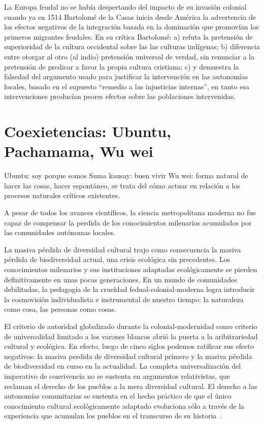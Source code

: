 \documentclass[a4paper,10pt]{book}
\theoremstyle{definition}
\begin{document}

La Europa feudal no se había despertando del impacto de su invasión colonial cuando ya en 1514 Bartolomé de la Casas inicia desde América la advertencia de los efectos negativos de la integración basada en la dominación que promovían los primeros migrantes feudales.
En su crítica Bartolomé:
a) refuta la pretensión de superioridad de la cultura occidental sobre las las culturas indígenas;
b) diferencia entre otorgar al otro (al indio) pretensión universal de verdad, sin renunciar a la pretensión de predicar a favor la propia cultura cristiana;
c) y demuestra la falsedad del argumento usado para justificar la intervención en las autonomías locales, basado en el supuesto ``remedio a las injusticias internas'', en tanto esa intervenciones producían peores efectos sobre las poblaciones intervenidas.

\section{Coexietencias: Ubuntu, Pachamama, Wu wei}

Ubuntu: soy porque somos
Suma kausay: buen vivir
Wu wei\cite{gerlach2005-wuwei}: forma natural de hacer las cosas, hacer espontáneo, se trata del cómo actuar en relación a los procesos naturales críticos existentes. 

A pesar de todos los avances científicos, la ciencia metropolitana moderna no fue capaz de compensar la perdida de los conocimientos milenarios acumulados por las comunidades autónomas locales.

La masiva pérdida de diversidad cultural trajo como consecuencia la masiva pérdida de biodiversidad actual, una crisis ecológica sin precedentes.
Los conocimientos milenarios y sus instituciones adaptadas ecológicamente se pierden definitivamente en unas pocas generaciones.
En un mundo de comunidades debilitadas, la pedagogía de la crueldad fedual-colonial-moderna logra introducir la cosmovisión individualista e instrumental de nuestro tiempo: la naturaleza como cosa, las personas como cosas.





El criterio de autoridad globalizado durante la colonial-modernidad como criterio de universalidad limitado a los varones blancos abrió la puerta a la aribitrariedad cultural y ecológica.
En efecto, luego de cinco siglos podemos ratificar sus efecto negativos: la masiva perdida de diversidad cultural primero y la masiva pérdida de biodiversidad en curso en la actualidad.
La completa universalización del imperativo de convivencia no se sustenta en argumentos relativistas, que reclaman el derecho de los pueblos a la mera diversidad cultural.
El derecho a las autonomías comunitarias se sustenta en el hecho práctico de que el único conocimiento cultural ecológicamente adaptado evoluciona sólo a través de la experiencia que acumulan los pueblos en el transcurso de su historia~\cite{Rita}.
\end{document}
